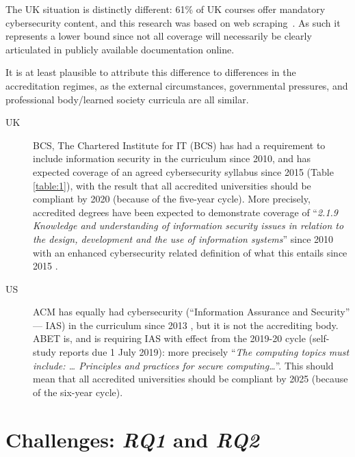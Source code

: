 \documentclass[conference]{IEEEtran}
\begin{document}
The UK situation is distinctly different: 61\% of UK courses offer mandatory cybersecurity content, and this research was based on web scraping~\cite[Table 1]{Ruiz2019a}. As such it represents a lower bound since not all coverage will necessarily be clearly articulated in publicly available documentation online.

It is at least plausible to attribute this difference to differences in the accreditation regimes, as the external circumstances, governmental pressures, and professional body/learned society curricula are all similar.

\begin{description}
\item[UK]BCS, The Chartered Institute for IT (BCS) has had a requirement to include information security in the curriculum since 2010, and has expected coverage of an agreed cybersecurity syllabus since 2015 (Table \ref{table:1}), with the result that all accredited universities should be compliant by 2020 (because of the five-year cycle). More precisely, accredited degrees have been expected to demonstrate coverage of ``{\emph{2.1.9 Knowledge and understanding of information security issues in relation to the design, development and the use of information systems}}'' \cite[p.~30]{BCS2018a} since 2010 with an enhanced cybersecurity related definition of what this entails since 2015 \cite[p.~17--18]{BCS2018a}.
\item[US]ACM has equally had cybersecurity (``Information Assurance and Security'' --- IAS) in the curriculum since 2013 \cite{ACM2013a}, but it is not the accrediting body. ABET is, and is requiring IAS with effect from the 2019-20 cycle (self-study reports due 1 July 2019): more precisely \cite[Table 3]{Oudshoornetal2018a} ``{\emph{The computing topics must include: \dots{} Principles and practices for secure computing\dots}}''. This should mean that  all accredited universities should be compliant by 2025 (because of the six-year cycle).
\end{description}

\section{Challenges: {\emph{RQ1}} and {\emph{RQ2}}}
\end{document}
